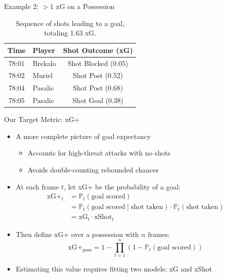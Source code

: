\documentclass{beamer}
\begin{document}
\begin{frame}{Example 2: $>1$ xG on a Possession}
\begin{table}[h]
\centering
\begin{tabular}{|c|l|c|}
\hline
\textbf{Time} & \textbf{Player} & \textbf{Shot Outcome (xG)} \\
\hline
78:01 & Brekalo & Shot Blocked (0.05) \\
78:02 & Muriel & Shot Post (0.52) \\
78:04 & Pasalic & Shot Post (0.68) \\
78:05 & Pasalic & Shot Goal (0.38) \\
\hline
\end{tabular}
\caption{Sequence of shots leading to a goal, totaling 1.63 xG.}
\end{table}
\end{frame}

\begin{frame}{Our Target Metric: xG+}
\begin{itemize}
\item A more complete picture of goal expectancy
  \begin{itemize}
  \item Accounts for high-threat attacks with no shots
  \item Avoids double-counting rebounded chances
  \end{itemize}
\item At each frame $t$, let xG+ be the probability of a goal:
\begin{align*}
\text{xG+}_t &= \mathbb{P}_t(\text{goal scored}) \\
&= \mathbb{P}_t(\text{goal scored} \mid \text{shot taken})\cdot\mathbb{P}_t(\text{shot taken}) \\
&= \text{xG}_t\cdot\text{xShot}_t
\end{align*}
\item Then define xG+ over a possession with $n$ frames:
$$\text{xG+}_\text{poss} = 1 - \prod_{t = 1}^n \left(1 - \mathbb{P}_t\left(\text{goal scored}\right)\right)$$
\item Estimating this value requires fitting two models: xG and xShot
\end{itemize}
\end{frame}
\end{document}
